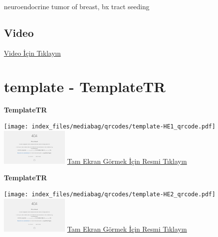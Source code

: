 \documentclass[
  letterpaper,
  DIV=11,
  numbers=noendperiod]{scrreprt}
\begin{document}
\begin{tcolorbox}[enhanced jigsaw, breakable, opacitybacktitle=0.6, arc=.35mm, colbacktitle=quarto-callout-tip-color!10!white, colback=white, toptitle=1mm, left=2mm, opacityback=0, colframe=quarto-callout-tip-color-frame, titlerule=0mm, rightrule=.15mm, bottomrule=.15mm, toprule=.15mm, bottomtitle=1mm, title=\textcolor{quarto-callout-tip-color}{\faLightbulb}\hspace{0.5em}{Tanı}, coltitle=black, leftrule=.75mm]

neuroendocrine tumor of breast, bx tract seeding

\end{tcolorbox}

\hypertarget{video-23}{%
\subsection{Video}\label{video-23}}

\href{https://www.youtube.com/watch?v=-S0_Hr6sNZ8}{Video İçin Tıklayın}

\hypertarget{sec-template}{%
\section{template - TemplateTR}\label{sec-template}}

\textbf{TemplateTR}

\texttt{[image: index\_files/mediabag/qrcodes/template-HE1\_qrcode.pdf]}
\href{https://images.patolojiatlasi.com/template/HE1.html}{\includegraphics[width=0.25\textwidth,height=\textheight]{./screenshots/thumbnail_template-HE1.png}}
\href{https://images.patolojiatlasi.com/template/HE1.html}{Tam Ekran
Görmek İçin Resmi Tıklayın}

\textbf{TemplateTR}

\texttt{[image: index\_files/mediabag/qrcodes/template-HE2\_qrcode.pdf]}
\href{https://images.patolojiatlasi.com/template/HE2.html}{\includegraphics[width=0.25\textwidth,height=\textheight]{./screenshots/thumbnail_template-HE2.png}}
\href{https://images.patolojiatlasi.com/template/HE2.html}{Tam Ekran
Görmek İçin Resmi Tıklayın}
\end{document}
